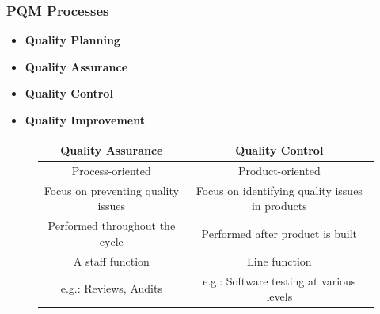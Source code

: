 \documentclass{article}
\begin{document}
\subsubsection{PQM Processes}
\begin{itemize}
    \item \textbf{Quality Planning}
    \item \textbf{Quality Assurance}
    \item \textbf{Quality Control}
    \item \textbf{Quality Improvement}
\end{itemize}
\begin{figure}[!h]
    \centering
    \begin{tabular}{|c|c|}
        \hline
        \textbf{Quality Assurance} & \textbf{Quality Control}  \\
        \hline
        Process-oriented & Product-oriented \\
        \hline
        Focus on preventing quality issues & Focus on identifying quality issues in products \\
        \hline
        Performed throughout the cycle & Performed after product is built \\
        \hline
        A staff function & Line function \\
        \hline
        e.g.: Reviews, Audits & e.g.: Software testing at various levels\\
        \hline
    \end{tabular}
\end{figure}
\end{document}
